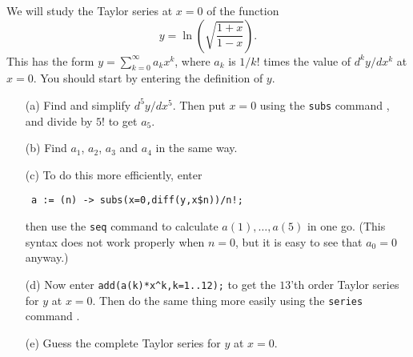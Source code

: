 \documentclass[a4paper,10pt]{amsbook}
\numberwithin{example}{chapter}
\begin{document}
\begin{exercise}\label{ex-ln}
 We will study the Taylor series at $x=0$ of the function 
 \[ y = \ln\left(\sqrt{\frac{1+x}{1-x}}\right).  \]
 This has the form $y=\sum_{k=0}^\infty a_kx^k$, where $a_k$
 is $1/k!$ times the value of $d^ky/dx^k$ at $x=0$.  You
 should start by entering the definition of $y$.
 \begin{itemize}
  \item[(a)] Find \note{\NOTEmultidiff} and simplify
   $d^5y/dx^5$.  Then put $x=0$ using the \verb~subs~
   command \note{\NOTEsubs}, and divide by $5!$ to get $a_5$.
  \item[(b)] Find $a_1$, $a_2$, $a_3$ and $a_4$ in the
   same way.
  \item[(c)] To do this more efficiently, enter 
\begin{verbatim}
 a := (n) -> subs(x=0,diff(y,x$n))/n!;
\end{verbatim}
   then use the \verb~seq~ command \note{\NOTEseq} to
   calculate $a(1),\dotsc,a(5)$ in one go.  (This syntax does not
   work properly when $n=0$, but it is easy to see that
   $a_0=0$ anyway.)
  \item[(d)] Now enter \verb~add(a(k)*x^k,k=1..12);~ to get
   the $13$'th order Taylor series for $y$ at $x=0$.  Then do the
   same thing more easily using the \verb~series~ command
   \note{\NOTEtaylor}. 
  \item[(e)] Guess the complete Taylor series for $y$ at $x=0$.
 \end{itemize}
\end{exercise}
\end{document}
